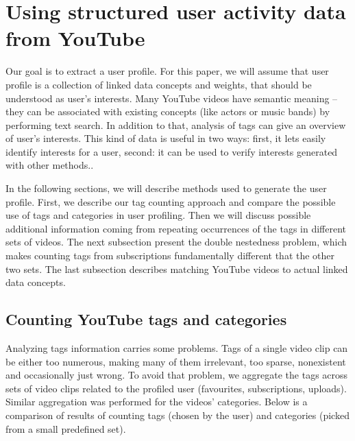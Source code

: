 \section{Using structured user activity data from YouTube}

Our goal is to extract a user profile. For this paper, we will assume that user
profile is a collection of linked data concepts and weights, that should be understood as
user's interests. Many YouTube videos have semantic meaning -- they can
be associated with existing concepts (like actors or music bands) by performing
text search. In addition to that, analysis of tags can give an overview of user's
interests. This kind of data is useful in two
ways: first, it lets easily identify interests for a user, second: it can be
used to verify interests generated with other methods..

In the following sections, we will describe methods used to generate the user
profile. First, we describe our tag counting approach and compare the possible
use of tags and categories in user profiling. Then we will discuss possible
additional information coming from repeating occurrences of the tags in
different sets of videos. The next subsection present the double
nestedness problem, which makes counting tags from subscriptions fundamentally
different that the other two sets. The last subsection describes matching
YouTube videos to actual linked data concepts.

\subsection{Counting YouTube tags and categories}
Analyzing tags information carries some problems. Tags of a single video clip
can be either too numerous, making many
of them irrelevant, too sparse, nonexistent and occasionally just wrong. To avoid
that problem, we aggregate the tags across sets of video clips related to the
profiled user (favourites, subscriptions, uploads). Similar aggregation was
performed for the videos' categories. Below is a comparison of results of counting
tags (chosen by the user) and categories (picked from a small predefined set).


